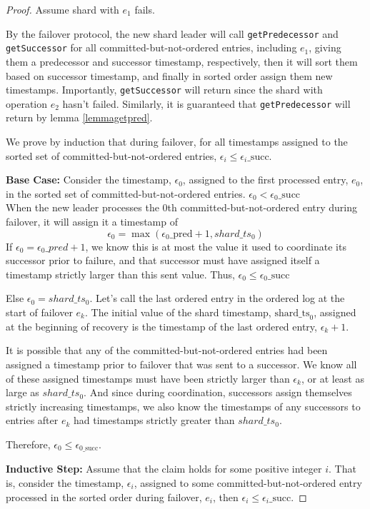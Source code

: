 \begin{proof}
Assume shard with $e_1$ fails.

By the failover protocol, the new shard leader will call \texttt{getPredecessor} and \texttt{getSuccessor} for all committed-but-not-ordered entries, including $e_1$, giving them a predecessor and successor timestamp, respectively, then it will sort them based on successor timestamp, and finally in sorted order assign them new timestamps. Importantly, \texttt{getSuccessor} will return since the shard with operation $e_2$ hasn't failed. Similarly, it is guaranteed that \texttt{getPredecessor} will return by lemma \ref{lemmagetpred}.

We prove by induction that during failover, for all timestamps assigned to the sorted set of committed-but-not-ordered entries, $\epsilon_i \leq \epsilon_i\_\text{succ}$.

\textbf{Base Case:} Consider the timestamp, $\epsilon_0$, assigned to the first processed entry, $e_0$, in the sorted set of committed-but-not-ordered entries.  $\epsilon_0 < \epsilon_0\_\text{succ}$
\\
When the new leader processes the 0th committed-but-not-ordered entry during failover, it will assign it a timestamp of
$$\epsilon_0 = \max(\epsilon_0\_\text{pred} + 1, shard\_ts_0)$$
If $\epsilon_0 = \epsilon_0\_pred + 1$, we know this is at most the value it used to coordinate its successor prior to failure, and that successor must have assigned itself a timestamp strictly larger than this sent value. Thus, $\epsilon_0 \leq \epsilon_0\_\text{succ}$

Else $\epsilon_0 = shard\_ts_0$.
Let's call the last ordered entry in the ordered log at the start of failover $e_k$. The initial value of the shard timestamp, $\text{shard\_ts}_0$, assigned at the beginning of recovery is the timestamp of the last ordered entry, $\epsilon_k + 1$. 

It is possible that any of the committed-but-not-ordered entries had been assigned a timestamp prior to failover that was sent to a successor. We know all of these assigned timestamps must have been strictly larger than $\epsilon_k$, or at least as large as $shard\_ts_0$. And since during coordination, successors assign themselves strictly increasing timestamps, we also know the timestamps of any successors to entries after $e_k$ had timestamps strictly greater than $shard\_ts_0$.

Therefore, $\epsilon_0 \leq \epsilon_{0\_\text{succ}}$.


\textbf{Inductive Step:} Assume that the claim holds for some positive integer $i$. That is, consider the timestamp, $\epsilon_i$, assigned to some committed-but-not-ordered entry processed in the sorted order during failover, $e_i$, then $\epsilon_i \leq \epsilon_i\_\text{succ}$.


\end{proof}
